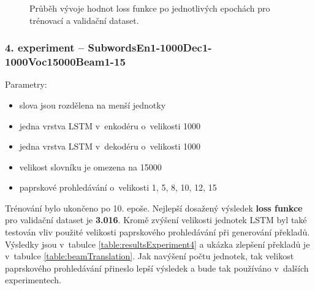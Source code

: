 \begin{figure}[H]
    \begin{center}
    \end{center}
	\caption{Průběh vývoje hodnot loss funkce po jednotlivých epochách pro trénovací a validační dataset.}
\end{figure}

\subsubsection{4. experiment -- SubwordsEn1-1000Dec1-1000Voc15000Beam1-15}\label{experiment4}
Parametry:
\begin{itemize}
  \item slova jsou rozdělena na menší jednotky
  \item jedna vrstva LSTM v~enkodéru o~velikosti 1000
  \item jedna vrstva LSTM v~dekodéru o~velikosti 1000
  \item velikost slovníku je omezena na 15000
  \item paprskové prohledávání o~velikosti 1, 5, 8, 10, 12, 15
\end{itemize}

Trénování bylo ukončeno po 10. epoše. Nejlepší dosažený výsledek \textbf{loss funkce} pro validační dataset je \textbf{3.016}. Kromě zvýšení velikosti jednotek LSTM byl také testován vliv použité velikosti paprskového prohledávání při generování překladů. Výsledky jsou v~tabulce \ref{table:resultsExperiment4} a ukázka zlepšení překladů je v~tabulce \ref{table:beamTranslation}. Jak navýšení počtu jednotek, tak velikost paprskového prohledávání přineslo lepší výsledek a bude tak používáno v~dalších experimentech.

